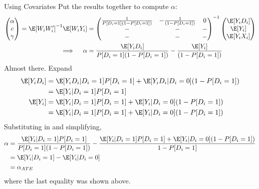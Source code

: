 \documentclass[aspectratio=169, handout]{beamer}
\begin{document}
{\footnotesize
\begin{frame}{Using Covariates}
Put the results together to compute $\alpha$:
\begin{align*}
  \begin{pmatrix}
    \alpha \\
    c \\
    \gamma
  \end{pmatrix}
  =
  \E[W_iW_i']^{-1}
  \E[W_iY_i]
  &=
  \begin{pmatrix}
    \frac{1}{P[D_i=1](1-P[D_i=1])}
    &
    - \frac{1}{(1-P[D_i=1])}
    & 0
    \\
    - & - & - \\
    - & - & - \\
  \end{pmatrix}^{-1}
  \begin{pmatrix}
    \E[Y_iD_i] \\
    \E[Y_i] \\
    \E[Y_iX_i]
  \end{pmatrix}
  \\
  \implies\quad
  \alpha
  &=
  \frac{\E[Y_iD_i]}{P[D_i=1](1-P[D_i=1])}
  - \frac{\E[Y_i]}{(1-P[D_i=1])}
\end{align*}
Almost there. Expand
\begin{align*}
  \E[Y_iD_i]
  &=
  \E[Y_iD_i|D_i=1]
  P[D_i=1]
  +
  \E[Y_iD_i|D_i=0]
  (1-P[D_i=1])
  \\
  &=
  \E[Y_i|D_i=1]
  P[D_i=1]
  \\
  \E[Y_i]
  &=
  \E[Y_i|D_i=1]
  P[D_i=1]
  +
  \E[Y_i|D_i=0]
  (1-P[D_i=1])
  \\
  &=
  \E[Y_i|D_i=1]
  P[D_i=1]
  +
  \E[Y_i|D_i=0]
  (1-P[D_i=1])
\end{align*}
Substituting in and simplifying,
\begin{align*}
  \alpha
  &=
  \frac{%
    \E[Y_i|D_i=1]
    P[D_i=1]
  }{P[D_i=1](1-P[D_i=1])}
  -
  \frac{%
    \E[Y_i|D_i=1]
    P[D_i=1]
    +
    \E[Y_i|D_i=0]
    (1-P[D_i=1])
  }{1-P[D_i=1]}
  \\
  &=
  \E[Y_i|D_i=1]
  -
  \E[Y_i|D_i=0]
  \\
  &=
  \alpha_{ATE}
\end{align*}
where the last equality was shown above.
\end{frame}
}
\end{document}
